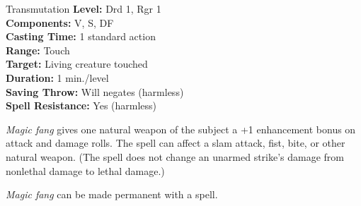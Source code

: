 {Transmutation}
{
	\textbf{Level:}
	Drd 1, Rgr 1\\
	\textbf{Components:}
	V, S, DF\\
	\textbf{Casting Time:}
	1 standard action\\
	\textbf{Range:}
	Touch\\
	\textbf{Target:}
	Living creature touched\\
	\textbf{Duration:}
	1 min./level\\
	\textbf{Saving Throw:}
	Will negates (harmless)\\
	\textbf{Spell Resistance:}
	Yes (harmless)\\
}
{
	\emph{Magic fang} gives one natural weapon of the subject a +1 enhancement bonus on attack and damage rolls. The spell can affect a slam attack, fist, bite, or other natural weapon. (The spell does not change an unarmed strike's damage from nonlethal damage to lethal damage.)

	\emph{Magic fang} can be made permanent with a  spell.

}
